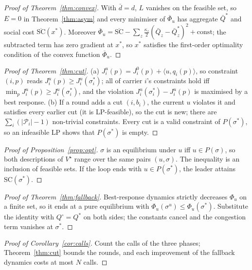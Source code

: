 \documentclass[preprint,11pt]{elsarticle}
\theoremstyle{definition}
\theoremstyle{remark}
\newcommand{\ip}[2]{\langle #1,#2\rangle}
\begin{document}
\begin{proof}[Proof of Theorem~\ref{thm:convex}]
With $\bar d=d$, $L$ vanishes on the feasible set, so $E=0$ in Theorem~\ref{thm:asym} and every minimiser of $\overline\Phi_u$ has aggregate $\bar Q^*$ and social cost $\overline{\mathrm{SC}}(x^*)$. Moreover $\overline\Phi_u=\overline{\mathrm{SC}}-\sum_z\tfrac{\kappa_z}{2}(\bar Q_z-\bar Q^*_z)^2+\text{const}$; the subtracted term has zero gradient at $x^*$, so $x^*$ satisfies the first-order optimality condition of the convex function $\overline\Phi_u$.
\end{proof}

\begin{proof}[Proof of Theorem~\ref{thm:cut}]
(a) $J^u_i(p)=J^0_i(p)+\ip{u}{q_i(p)}$, so constraint $(i,p)$ reads $J^u_i(p)\ge J^u_i(\sigma^*_i)$; all of carrier $i$'s constraints hold iff $\min_pJ^u_i(p)\ge J^u_i(\sigma^*_i)$, and the violation $J^u_i(\sigma^*_i)-J^u_i(p)$ is maximised by a best response. (b) If a round adds a cut $(i,b_i)$, the current $u$ violates it and satisfies every earlier cut (it is LP-feasible), so the cut is new; there are $\sum_i(|\mathcal P_i|-1)$ non-trivial constraints. Every cut is a valid constraint of $P(\sigma^*)$, so an infeasible LP shows that $P(\sigma^*)$ is empty.
\end{proof}

\begin{proof}[Proof of Proposition~\ref{prop:opt}]
$\sigma$ is an equilibrium under $u$ iff $u\in P(\sigma)$, so both descriptions of $V^\star$ range over the same pairs $(u,\sigma)$. The inequality is an inclusion of feasible sets. If the loop ends with $u\in P(\sigma^*)$, the leader attains $\mathrm{SC}(\sigma^*)$.
\end{proof}

\begin{proof}[Proof of Theorem~\ref{thm:fallback}]
Best-response dynamics strictly decreases $\Phi_u$ on a finite set, so it ends at a pure equilibrium with $\Phi_u(\sigma^u)\le\Phi_u(\sigma^*)$. Substitute the identity with $Q^\circ=Q^*$ on both sides; the constants cancel and the congestion term vanishes at $\sigma^*$.
\end{proof}

\begin{proof}[Proof of Corollary~\ref{cor:calls}]
Count the calls of the three phases; Theorem~\ref{thm:cut} bounds the rounds, and each improvement of the fallback dynamics costs at most $N$ calls.
\end{proof}
\end{document}
